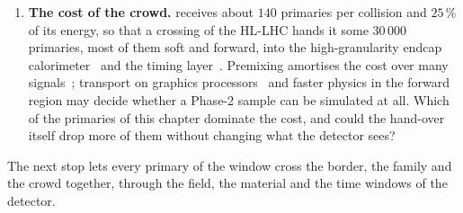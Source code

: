 \begin{enumerate}
    $200$, and in 2025 the default stepping kills them in the dead region of
    the beam line before the ZDC. The Phase-2 stepping of the release, chosen
    as soon as the geometry has the new endcap calorimeter or the timing
    layer, does not read the flag that would let them through, so that the
    ZDC of the HL-LHC geometry is simulated and receives none of them, while
    the beam-line instrumentation around it is being
    upgraded~\cite{CMS:2021BRIL}. Should these primaries be handed over at
    all in the samples that do not study the forward region, and how would
    a study that does reach the ZDC?
  \item \textbf{The cost of the crowd.} \GEANT receives about $140$
    primaries per collision and $25\,\%$ of its energy, so that a crossing of
    the HL-LHC hands it some $30\,000$ primaries, most of them soft and
    forward, into the high-granularity endcap
    calorimeter~\cite{CMS:2017jpq} and the timing layer~\cite{Butler:2019rpu}.
    Premixing amortises the cost over many signals~\cite{Hildreth:2017caz};
    transport on graphics processors~\cite{Johnson:2021Celeritas,Amadio:2023AdePT}
    and faster physics in the forward region may decide whether a
    Phase-2 sample can be simulated at all. Which of the primaries of this
    chapter dominate the cost, and could the hand-over itself drop more of
    them without changing what the detector sees?
\end{enumerate}
The next stop lets every primary of the window cross the border, the
family and the crowd together, through the field, the material and the
time windows of the detector.
